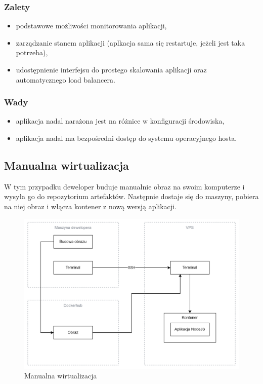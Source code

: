 \documentclass{article}
\begin{document}
\subsubsection{Zalety}

\begin{itemize}
    \item podstawowe możliwości monitorowania aplikacji,
    \item zarządzanie stanem aplikacji (aplkacja sama się restartuje, jeżeli jest taka potrzeba),
    \item udostępnienie interfejsu do prostego skalowania aplikacji oraz automatycznego load balancera.
\end{itemize}

\subsubsection{Wady}

\begin{itemize}
    \item aplikacja nadal narażona jest na różnice w konfiguracji środowiska,
    \item aplikacja nadal ma bezpośredni dostęp do systemu operacyjnego hosta.
\end{itemize}

\subsection{Manualna wirtualizacja}

W tym przypadku deweloper buduje manualnie obraz na swoim komputerze i wysyła go do repozytorium artefaktów. Następnie dostaje się do maszyny, pobiera na niej obraz i włącza kontener z nową wersją aplikacji.

\begin{figure}[H]
    \centering
    \includegraphics[width=1\linewidth]{manualnaWirtualizacja.png}
    \caption{Manualna wirtualizacja}
    \label{fig:enter-label}
\end{figure}
\end{document}
